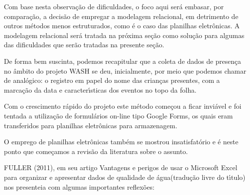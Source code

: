 \documentclass[
12pt,		%
openright,	%
twoside,  %
a4paper,			%
chapter=TITLE,		%
english,			%
french,				%
spanish,			%
brazil				%
]{USPSC-classe/USPSC}
\begin{document}
Com base nesta observa\c{c}\~ao de dificuldades, o foco aqui ser\'a embasar, por compara\c{c}\~ao, a decis\~ao de empregar a modelagem relacional, em detrimento de outros m\'etodos menos estruturados, como \'e o caso das planilhas eletr\^onicas. A modelagem relacional ser\'a tratada na pr\'oxima se\c{c}\~ao como solu\c{c}\~ao para algumas das dificuldades que ser\~ao tratadas na presente se\c{c}\~ao.














De forma bem suscinta, podemos recapitular que a coleta de dados de presen\c{c}a no \^ambito do projeto WASH se deu, inicialmente, por meio que podemos chamar de anal\'ogico: o registro em papel do nome das crian\c{c}as presentes, com a marca\c{c}\~ao da data e caracter\'{\i}sticas dos eventos no topo da folha.














Com o crescimento r\'apido do projeto este m\'etodo come\c{c}ou a ficar invi\'avel e foi tentada a utiliza\c{c}\~ao de formul\'arios on-line tipo \textquotedbl Google Forms\textquotedbl , os quais eram transferidos para planilhas eletr\^onicas para armazenagem.














O emprego de planilhas eletr\^onicas tamb\'em se mostrou insatisfat\'orio e \'e neste ponto que come\c{c}amos a revis\~ao da literatura sobre o assunto.














FULLER (2011), em seu artigo \textquotedbl Vantagens e perigos de usar o Microsoft Excel para organizar e apresentar dados de qualidade de \'agua\textquotedbl  (tradu\c{c}\~ao livre do t\'{\i}tulo) nos presenteia com algumas importantes reflex\~oes:
\end{document}
